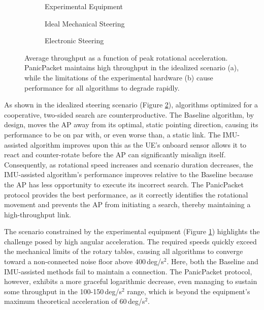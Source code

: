\documentclass[fleqn,10pt]{wlscirep}
\begin{document}
\begin{figure}[ht!]
    \centering
    \begin{subfigure}{0.32\linewidth}
        
        \vspace{-25 pt}
        \caption{Experimental Equipment}
        \label{fig:rot_exp_rate}
    \end{subfigure}
    \hfill
    \begin{subfigure}{0.32\linewidth}
        
        \vspace{-25 pt}
        \caption{Ideal Mechanical Steering}
        \label{fig:rot_sim_rate}
    \end{subfigure}
    \hfill
    \begin{subfigure}{0.32\linewidth}
        
        \vspace{-25 pt}
        \caption{Electronic Steering}
        \label{fig:rot_simfast_rate}
    \end{subfigure}
    
    \caption{Average throughput as a function of peak rotational acceleration. PanicPacket maintains high throughput in the idealized scenario (a), while the limitations of the experimental hardware (b) cause performance for all algorithms to degrade rapidly.}
    \label{fig:rotational_rate}
\end{figure}

As shown in the idealized steering scenario (Figure \ref{fig:rot_sim_rate}), algorithms optimized for a cooperative, two-sided search are counterproductive. The Baseline algorithm, by design, moves the AP away from its optimal, static pointing direction, causing its performance to be on par with, or even worse than, a static link. The IMU-assisted algorithm improves upon this as the UE's onboard sensor allows it to react and counter-rotate before the AP can significantly misalign itself. Consequently, as rotational speed increases and scenario duration decreases, the IMU-assisted algorithm's performance improves relative to the Baseline because the AP has less opportunity to execute its incorrect search. The PanicPacket protocol provides the best performance, as it correctly identifies the rotational movement and prevents the AP from initiating a search, thereby maintaining a high-throughput link.

The scenario constrained by the experimental equipment (Figure \ref{fig:rot_exp_rate}) highlights the challenge posed by high angular acceleration. The required speeds quickly exceed the mechanical limits of the rotary tables, causing all algorithms to converge toward a non-connected noise floor above 400\,deg/s$^2$. Here, both the Baseline and IMU-assisted methods fail to maintain a connection. The PanicPacket protocol, however, exhibits a more graceful logarithmic decrease, even managing to sustain some throughput in the 100-150\,deg/s$^2$ range, which is beyond the equipment's maximum theoretical acceleration of 60\,deg/s$^2$.
\end{document}
